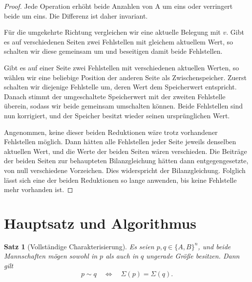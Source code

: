 \documentclass[12pt]{article}
\newtheorem{satz}{Satz}[section]
\begin{document}
\begin{proof}
Jede Operation erhöht beide Anzahlen von A um eins oder verringert beide um
eins. Die Differenz ist daher invariant.

Für die umgekehrte Richtung vergleichen wir eine aktuelle Belegung mit $v$.
Gibt es auf verschiedenen Seiten zwei Fehlstellen mit gleichem aktuellem
Wert, so schalten wir diese gemeinsam um und beseitigen damit beide
Fehlstellen.

Gibt es auf einer Seite zwei Fehlstellen mit verschiedenen aktuellen Werten,
so wählen wir eine beliebige Position der anderen Seite als Zwischenspeicher.
Zuerst schalten wir diejenige Fehlstelle um, deren Wert dem Speicherwert
entspricht. Danach stimmt der umgeschaltete Speicherwert mit der zweiten
Fehlstelle überein, sodass wir beide gemeinsam umschalten können. Beide
Fehlstellen sind nun korrigiert, und der Speicher besitzt wieder seinen
ursprünglichen Wert.

Angenommen, keine dieser beiden Reduktionen wäre trotz vorhandener
Fehlstellen möglich. Dann hätten alle Fehlstellen jeder Seite jeweils
denselben aktuellen Wert, und die Werte der beiden Seiten wären verschieden.
Die Beiträge der beiden Seiten zur behaupteten Bilanzgleichung hätten dann
entgegengesetzte, von null verschiedene Vorzeichen. Dies widerspricht der
Bilanzgleichung. Folglich lässt sich eine der beiden Reduktionen so lange
anwenden, bis keine Fehlstelle mehr vorhanden ist.
\end{proof}

\section{Hauptsatz und Algorithmus}

\begin{satz}[Vollständige Charakterisierung]
\label{satz:charakterisierung}
Es seien $p,q\in\{A,B\}^n$, und beide Mannschaften mögen sowohl in $p$ als
auch in $q$ ungerade Größe besitzen. Dann gilt
\[
p\sim q
\quad\Longleftrightarrow\quad
\Sigma(p)=\Sigma(q).
\]
\end{satz}
\end{document}
